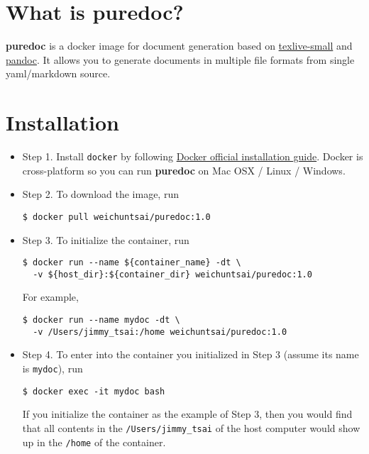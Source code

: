\documentclass[10pt, a4paper, oneside]{article}
\begin{document}
\section{What is puredoc?}\label{what-is-puredoc}

\textbf{puredoc} is a docker image for document generation based on
\href{https://github.com/weichuntsai0217/texlive-small}{texlive-small} and
\href{https://pandoc.org/}{pandoc}.
It allows you to generate documents in multiple file formats
from single yaml/markdown source.

\section{Installation}\label{installation}

\begin{itemize}
\item
  Step 1. Install \texttt{docker} by following \href{https://docs.docker.com/install/}{Docker official installation guide}.
  Docker is cross-platform so you can run \textbf{puredoc} on Mac OSX / Linux / Windows.
\item
  Step 2. To download the image, run

\begin{verbatim}
$ docker pull weichuntsai/puredoc:1.0
\end{verbatim}
\item
  Step 3. To initialize the container, run

\begin{verbatim}
$ docker run --name ${container_name} -dt \
  -v ${host_dir}:${container_dir} weichuntsai/puredoc:1.0
\end{verbatim}

  For example,

\begin{verbatim}
$ docker run --name mydoc -dt \
  -v /Users/jimmy_tsai:/home weichuntsai/puredoc:1.0
\end{verbatim}
\item
  Step 4. To enter into the container you initialized in Step 3 (assume its name is \texttt{mydoc}), run

\begin{verbatim}
$ docker exec -it mydoc bash
\end{verbatim}

  If you initialize the container as the example of Step 3,
  then you would find that all contents in the \texttt{/Users/jimmy\_tsai} of the host computer
  would show up in the \texttt{/home} of the container.
\end{itemize}
\end{document}
